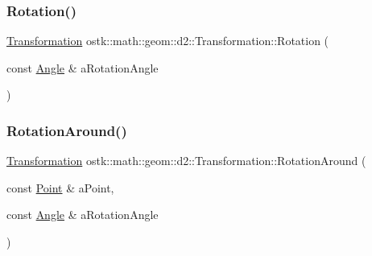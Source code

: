 \subsubsection{\texorpdfstring{Rotation()}{Rotation()}}
{\footnotesize\ttfamily \hyperlink{classostk_1_1math_1_1geom_1_1d2_1_1_transformation}{Transformation} ostk\+::math\+::geom\+::d2\+::\+Transformation\+::\+Rotation (\begin{DoxyParamCaption}\item[{const \hyperlink{classostk_1_1math_1_1geom_1_1_angle}{Angle} \&}]{a\+Rotation\+Angle }\end{DoxyParamCaption})\hspace{0.3cm}{\ttfamily [static]}}

\mbox{\label{classostk_1_1math_1_1geom_1_1d2_1_1_transformation_a6a23b51b7b0b20c474cc6a94e2ebb8c5}} 
\subsubsection{\texorpdfstring{Rotation\+Around()}{RotationAround()}}
{\footnotesize\ttfamily \hyperlink{classostk_1_1math_1_1geom_1_1d2_1_1_transformation}{Transformation} ostk\+::math\+::geom\+::d2\+::\+Transformation\+::\+Rotation\+Around (\begin{DoxyParamCaption}\item[{const \hyperlink{classostk_1_1math_1_1geom_1_1d2_1_1objects_1_1_point}{Point} \&}]{a\+Point,  }\item[{const \hyperlink{classostk_1_1math_1_1geom_1_1_angle}{Angle} \&}]{a\+Rotation\+Angle }\end{DoxyParamCaption})\hspace{0.3cm}{\ttfamily [static]}}

\mbox{\label{classostk_1_1math_1_1geom_1_1d2_1_1_transformation_a713fb496f41bcc03bdd881a438958fea}} 
